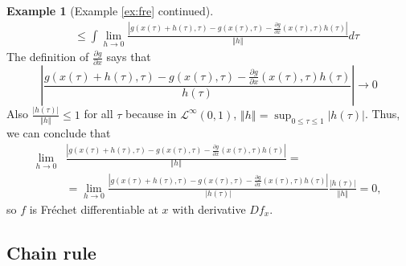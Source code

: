 \documentclass[12pt,reqno]{amsart}
\theoremstyle{definition}
\newtheorem*{example*}{Example}
\newcommand{\norm}[1]{\left\Vert {#1} \right\Vert}
\newcommand{\abs}[1]{\left\vert {#1} \right\vert}
\renewcommand{\to}{{\rightarrow}}
\begin{document}
\begin{example*}[Example \ref{ex:fre} continued]
\begin{align*}
    \;\; & \leq  \int \lim_{h \to 0} \frac{ \abs{ g(x(\tau) + h(\tau), \tau) -
        g(x(\tau),\tau) - \frac{\partial g}{\partial x}(x(\tau),\tau)
        h(\tau)} } {\norm{h}} d\tau 
  \end{align*}
  The definition of $\frac{\partial g}{\partial x}$ says that
  \[ \abs{\frac{ g(x(\tau) + h(\tau), \tau) -
      g(x(\tau),\tau) - \frac{\partial g}{\partial x}(x(\tau),\tau)
      h(\tau)}{h(\tau)}} \to 0 \]
  Also $\frac{\abs{h(\tau)}}{\norm{h}} \leq 1$ for all $\tau$ because
  in $\mathcal{L}^\infty(0,1)$, $\norm{h} = \sup_{0 \leq \tau \leq 1}
  \abs{h(\tau)}$. Thus, we can conclude that
  \begin{align*}
    \lim_{h \to 0} & \frac{ \abs{ g(x(\tau) + h(\tau), \tau) -
        g(x(\tau),\tau) - \frac{\partial g}{\partial x}(x(\tau),\tau)
        h(\tau)} } {\norm{h}}
    = \\ 
    & = \lim_{h \to 0} \frac{ \abs{ g(x(\tau) + h(\tau), \tau) -
        g(x(\tau),\tau) - \frac{\partial g}{\partial x}(x(\tau),\tau)
        h(\tau)} } {\abs{h(\tau)}} \frac{\abs{h(\tau)}} {\norm{h}}  
    = 0,
  \end{align*}
  so $f$ is Fr\'{e}chet differentiable at $x$ with derivative $Df_x$. 
\end{example*}


\subsection{Chain rule}
\end{document}
